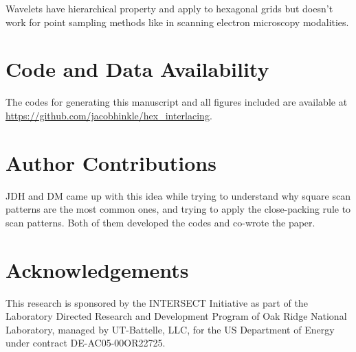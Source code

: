 \documentclass[aip, amsmath, amssymb, nobibnotes, nofootinbib, citeautoscript, reprint, superscriptaddress]{revtex4-2}
\begin{document}
    Wavelets have hierarchical property and apply to hexagonal grids \cite{hex_compression} but doesn't work for point sampling methods like in scanning electron microscopy modalities.

    \section{Code and Data Availability}

    The codes for generating this manuscript and all figures included are available at \url{https://github.com/jacobhinkle/hex_interlacing}. 

    \section{\label{sec:contribs}Author Contributions}
    JDH and DM came up with this idea while trying to understand why square scan patterns are the most common ones, and trying to apply the close-packing rule to scan patterns. Both of them developed the codes and co-wrote the paper.

    \section{\label{sec:acknowledgement}Acknowledgements}

    This research is sponsored by the INTERSECT Initiative as part of the Laboratory Directed Research and Development Program of Oak Ridge National Laboratory, managed by UT-Battelle, LLC, for the US Department of Energy under contract DE-AC05-00OR22725. 
    
    
\end{document}
